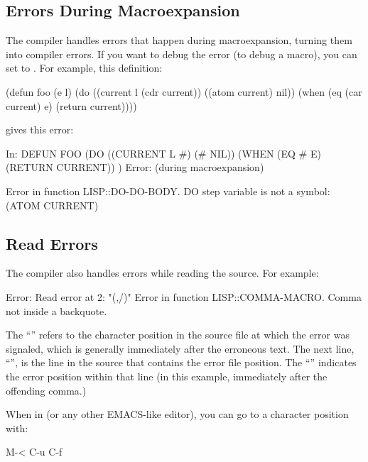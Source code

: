 \subsection{Errors During Macroexpansion}

The compiler handles errors that happen during macroexpansion, turning
them into compiler errors.  If you want to debug the error (to debug a
macro), you can set  to .  For
example, this definition:

\begin{lisp}
(defun foo (e l)
  (do ((current l (cdr current))
       ((atom current) nil))
      (when (eq (car current) e) (return current))))
\end{lisp}

gives this error:

\begin{example}
In: DEFUN FOO
  (DO ((CURRENT L #) (# NIL)) (WHEN (EQ # E) (RETURN CURRENT)) )
Error: (during macroexpansion)

Error in function LISP::DO-DO-BODY.
DO step variable is not a symbol: (ATOM CURRENT)
\end{example}


\subsection{Read Errors}

The compiler also handles errors while reading the source.  For example:

\begin{example}
Error: Read error at 2:
 "(,/)"
Error in function LISP::COMMA-MACRO.
Comma not inside a backquote.
\end{example}

The ``'' refers to the character position in the source file at
which the error was signaled, which is generally immediately after the
erroneous text.  The next line, ``'', is the line in
the source that contains the error file position.  The ``\code{/\back{} }''
indicates the error position within that line (in this example,
immediately after the offending comma.)

When in \hemlock{} (or any other EMACS-like editor), you can go to a
character position with:

\begin{example}
M-< C-u  C-f
\end{example}

